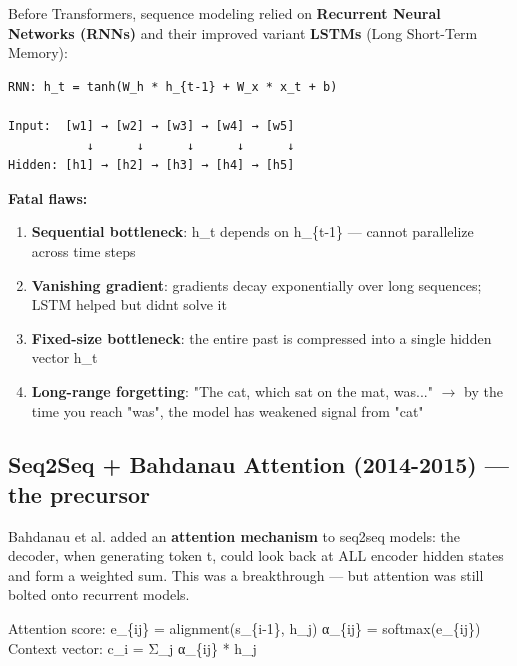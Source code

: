 \documentclass[11pt]{article}
\providecommand{\tightlist}{\setlength{\itemsep}{1pt}\setlength{\parskip}{0pt}}
\newenvironment{Shaded}{\begin{snugshade}}{\end{snugshade}}
\newcommand{\DecValTok}[1]{\textcolor[rgb]{0.96,0.45,0.00}{#1}}
\newcommand{\NormalTok}[1]{\textcolor[rgb]{0.81,0.81,0.76}{#1}}
\newcommand{\OperatorTok}[1]{\textcolor[rgb]{0.81,0.81,0.76}{#1}}
\begin{document}
Before Transformers, sequence modeling relied on \textbf{Recurrent Neural Networks (RNNs)} and their improved variant \textbf{LSTMs} (Long Short-Term Memory):

\setcodelang{}

\begin{verbatim}
RNN: h_t = tanh(W_h * h_{t-1} + W_x * x_t + b)

Input:  [w1] → [w2] → [w3] → [w4] → [w5]
           ↓      ↓      ↓      ↓      ↓
Hidden: [h1] → [h2] → [h3] → [h4] → [h5]
\end{verbatim}

\textbf{Fatal flaws:}

\begin{enumerate}
\def\labelenumi{\arabic{enumi}.}
\tightlist
\item
  \textbf{Sequential bottleneck}: h\_t depends on h\_\{t-1\} --- cannot parallelize across time steps
\item
  \textbf{Vanishing gradient}: gradients decay exponentially over long sequences; LSTM helped but didn\textquotesingle t solve it
\item
  \textbf{Fixed-size bottleneck}: the entire past is compressed into a single hidden vector h\_t
\item
  \textbf{Long-range forgetting}: "The cat, which sat on the mat, was..." \(\rightarrow\) by the time you reach "was", the model has weakened signal from "cat"
\end{enumerate}

\subsection{Seq2Seq + Bahdanau Attention (2014-2015) --- the precursor}\label{seq2seq--bahdanau-attention-2014-2015--the-precursor}

Bahdanau et al. added an \textbf{attention mechanism} to seq2seq models: the decoder, when generating token t, could look back at ALL encoder hidden states and form a weighted sum. This was a breakthrough --- but attention was still bolted onto recurrent models.


\begin{Shaded}
\begin{Highlighting}[]
\NormalTok{Attention score: e\_\{ij\} }\OperatorTok{=}\NormalTok{ alignment(s\_\{i}\OperatorTok{{-}}\DecValTok{1}\NormalTok{\}, h\_j)}
\NormalTok{                α\_\{ij\} }\OperatorTok{=}\NormalTok{ softmax(e\_\{ij\})}
\NormalTok{Context vector: c\_i }\OperatorTok{=}\NormalTok{ Σ\_j α\_\{ij\} }\OperatorTok{*}\NormalTok{ h\_j}
\end{Highlighting}
\end{Shaded}
\end{document}
